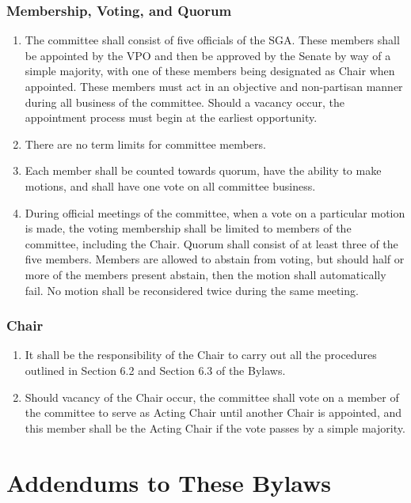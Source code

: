 \documentclass[12pt]{scrreprt}
\begin{document}
\subsection {Membership, Voting, and Quorum}
\begin{enumerate}
    \item The committee shall consist of five officials of the SGA. These members
shall be appointed by the VPO and then be approved by the Senate by way
of a simple majority, with one of these members being designated as Chair
when appointed. These members must act in an objective and non-partisan
manner during all business of the committee. Should a vacancy occur, the
appointment process must begin at the earliest opportunity.
\item There are no
term limits for committee members.
\item Each member shall be counted
towards quorum, have the ability to make motions,
and shall have one vote on all committee business.
\item During official meetings of
the committee, when a vote on a particular motion is made, the voting
membership shall be limited to members of the committee, including the
Chair. Quorum shall consist of at least three of the five members. Members
are allowed to abstain from voting, but should half or more of the
members present abstain, then the motion shall automatically fail. No
motion shall be reconsidered twice during the same meeting.
\end{enumerate}
\subsection {Chair}
\begin{enumerate}
    \item It shall be the responsibility of the Chair to carry out all the procedures
outlined in
Section 6.2 and Section 6.3 of the Bylaws.
\item Should vacancy of the Chair occur,
the committee shall vote on a member of the committee to serve as Acting
Chair until another Chair is appointed, and this member shall be the Acting
Chair if the vote passes by a simple majority.
\end{enumerate}



\chapter{Addendums to These Bylaws} \label{sec:addendums}
\end{document}
